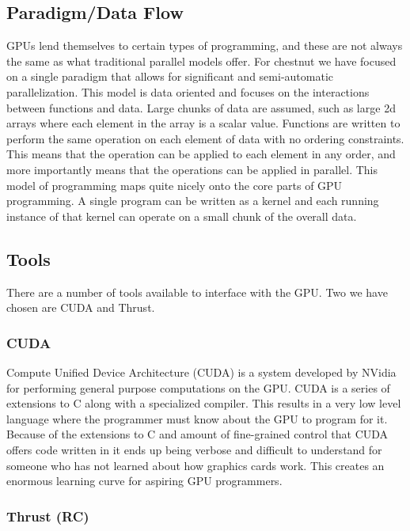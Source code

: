 \documentclass[twocolumn]{article}
\renewcommand{\|}{\origbar} %
\begin{document}
\subsection{Paradigm/Data Flow}

GPUs lend themselves to certain types of programming, and these are not always the same as what traditional parallel models offer. For chestnut we have focused on a single paradigm that allows for significant and semi-automatic parallelization. This model is data oriented and focuses on the interactions between functions and data. Large chunks of data are assumed, such as large 2d arrays where each element in the array is a scalar value. Functions are written to perform the same operation on each element of data with no ordering constraints. This means that the operation can be applied to each element in any order, and more importantly means that the operations can be applied in parallel. This model of programming maps quite nicely onto the core parts of GPU programming. A single program can be written as a kernel and each running instance of that kernel can operate on a small chunk of the overall data.

\subsection{Tools}

There are a number of tools available to interface with the GPU. Two we have chosen are CUDA and Thrust.

\subsubsection{CUDA}

Compute Unified Device Architecture (CUDA) is a system developed by NVidia for performing general purpose computations on the GPU. CUDA is a series of extensions to C along with a specialized compiler. This results in a very low level language where the programmer must know about the GPU to program for it. Because of the extensions to C and amount of fine-grained control that CUDA offers code written in it ends up being verbose and difficult to understand for someone who has not learned about how graphics cards work. This creates an enormous learning curve for aspiring GPU programmers. 

\subsubsection{Thrust (RC)}
\end{document}
